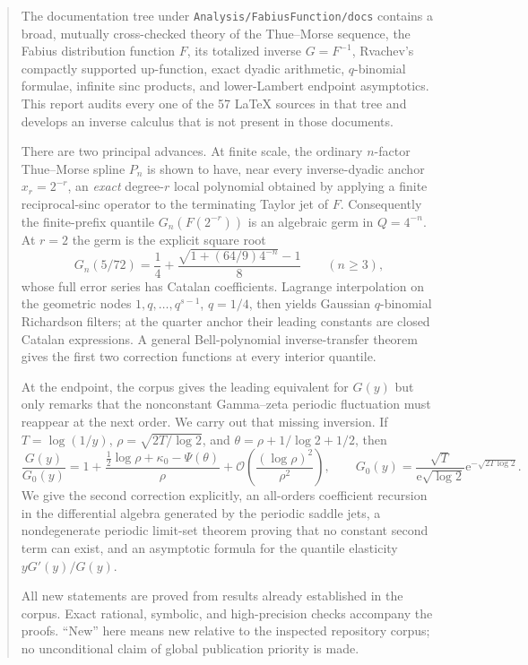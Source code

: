 \documentclass[11pt,oneside]{article}
\numberwithin{equation}{section}
\theoremstyle{definition}
\theoremstyle{remark}
\newcommand{\e}{\mathrm e}
\newcommand{\bigO}{\mathcal O}
\newcommand{\repo}{\nolinkurl{Analysis/FabiusFunction/docs}}
\begin{document}
\begin{abstract}
The documentation tree under \repo{} contains a broad, mutually cross-checked theory of the
Thue--Morse sequence, the Fabius distribution function $F$, its totalized inverse
$G=F^{-1}$, Rvachev's compactly supported up-function, exact dyadic arithmetic,
$q$-binomial formulae, infinite sinc products, and lower-Lambert endpoint asymptotics.
This report audits every one of the 57 LaTeX sources in that tree and develops an inverse
calculus that is not present in those documents.

There are two principal advances.  At finite scale, the ordinary $n$-factor Thue--Morse
spline $P_n$ is shown to have, near every inverse-dyadic anchor $x_r=2^{-r}$, an
\emph{exact} degree-$r$ local polynomial obtained by applying a finite reciprocal-sinc
operator to the terminating Taylor jet of $F$.  Consequently the finite-prefix quantile
$G_n(F(2^{-r}))$ is an algebraic germ in $Q=4^{-n}$.  At $r=2$ the germ is the explicit
square root
\[
 G_n(5/72)=\frac14+\frac{\sqrt{1+(64/9)4^{-n}}-1}{8}\qquad(n\ge3),
\]
whose full error series has Catalan coefficients.  Lagrange interpolation on the geometric
nodes $1,q,\ldots,q^{s-1}$, $q=1/4$, then yields Gaussian $q$-binomial Richardson filters;
at the quarter anchor their leading constants are closed Catalan expressions.  A general
Bell-polynomial inverse-transfer theorem gives the first two correction functions at every
interior quantile.

At the endpoint, the corpus gives the leading equivalent for $G(y)$ but only remarks that
the nonconstant Gamma--zeta periodic fluctuation must reappear at the next order.  We carry
out that missing inversion.  If $T=\log(1/y)$,
$\rho=\sqrt{2T/\log2}$, and $\theta=\rho+1/\log2+1/2$, then
\[
 \frac{G(y)}{G_0(y)}
 =1+\frac{\tfrac12\log\rho+\kappa_0-\Psi(\theta)}{\rho}
 +\bigO\!\left(\frac{(\log\rho)^2}{\rho^2}\right),
 \qquad
 G_0(y)=\frac{\sqrt T}{\e\sqrt{\log2}}\e^{-\sqrt{2T\log2}}.
\]
We give the second correction explicitly, an all-orders coefficient recursion in the
differential algebra generated by the periodic saddle jets, a nondegenerate periodic limit-set
theorem proving that no constant second term can exist, and an asymptotic formula for the
quantile elasticity $yG'(y)/G(y)$.

All new statements are proved from results already established in the corpus.  Exact rational,
symbolic, and high-precision checks accompany the proofs.  ``New'' here means new relative
to the inspected repository corpus; no unconditional claim of global publication priority is
made.
\end{abstract}
\end{document}
